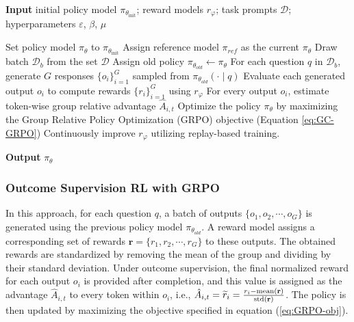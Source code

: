 \begin{itemize}[topsep=0pt]
\begin{itemize}[topsep=0pt]
\begin{algorithm}[t]
  \small
  \caption{Iterative Group Relative Policy Optimization}
  \textbf{Input} initial policy model $\pi_{\theta_{\text{init}}}$; reward models $r_\varphi$; task prompts $\mathcal{D}$; 
  hyperparameters $\varepsilon$, $\beta$, $\mu$
  \begin{algorithmic}[1]
    \State Set policy model $\pi_\theta$ to $\pi_{\theta_{\text{init}}}$
       \State Assign reference model $\pi_{ref}$ as the current $\pi_{\theta}$
      \State Draw batch $\mathcal{D}_b$ from the set $\mathcal{D}$
      \State Assign old policy $\pi_{\theta_{old}} \leftarrow \pi_{\theta}$
      \State For each question $q$ in $\mathcal{D}_b$, generate $G$ responses $\{o_i\}_{i=1}^G$ sampled from $\pi_{\theta_{old}} (\cdot \mid q)$
      \State Evaluate each generated output $o_i$ to compute rewards $\{r_i\}_{i=1}^{G}$ using $r_\varphi$
      \State For every output $o_i$, estimate token-wise group relative advantage $\hat{A}_{i,t}$
        \State Optimize the policy $\pi_{\theta}$ by maximizing the Group Relative Policy Optimization (GRPO) objective (Equation \ref{eq:GC-GRPO})
      \EndFor
    \EndFor
    \State Continuously improve $r_\varphi$ utilizing replay-based training.
    \EndFor 
  \end{algorithmic}
  \textbf{Output} $\pi_\theta$
  \label{alg:iter-grpo}
\end{algorithm}

\subsubsection{Outcome Supervision RL with GRPO} In this approach, for each question $q$, a batch of outputs $\{o_1, o_2, \cdots, o_G\}$ is generated using the previous policy model $\pi_{\theta_{old}}$. A reward model assigns a corresponding set of rewards $\mathbf{r} = \{r_1, r_2, \cdots, r_G\}$ to these outputs. The obtained rewards are standardized by removing the mean of the group and dividing by their standard deviation. Under outcome supervision, the final normalized reward for each output $o_i$ is provided after completion, and this value is assigned as the advantage $\hat{A}_{i, t}$ to every token within $o_i$, i.e., $\hat{A}_{i, t} = \widetilde{r}_i = \frac{r_i- {\rm mean}(\mathbf{r})}{{\rm std}(\mathbf{r})}$. The policy is then updated by maximizing the objective specified in equation (\ref{eq:GRPO-obj}).


\end{itemize}
\end{itemize}

